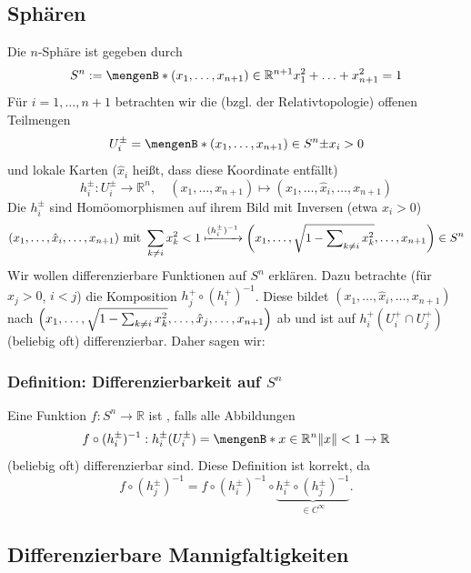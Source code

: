 \subsection{Sphären} %
\label{sub:11}%
Die $n$-Sphäre ist gegeben durch
\[
	S^n := \set[(x_1, \ldots , x_{n+1}) \in \mathds{R}^{n+1}]{x_1^2 + \ldots + x_{n+1}^2 = 1} 
\]
Für $i=1, \ldots , n+1$ betrachten wir die (bzgl. der Relativtopologie) offenen Teilmengen
\[
	U_i^{\pm} = \set[(x_1, \ldots , x_{n+1}) \in S^n]{\pm x_i >0} 
\]
und lokale Karten {\color{light_gray}\footnotesize($\hat x_i$ heißt, dass diese Koordinate entfällt)}
\[
	h_i^\pm : U_i^\pm \to \mathds{R}^n, \quad (x_1, \ldots , x_{n+1}) \mapsto (x_1, \ldots , \hat x_i, \ldots , x_{n+1}) \tag{weglassen}
\]
Die $h_i^\pm$ sind Homöomorphismen auf ihrem Bild mit Inversen (etwa $x_i >0$)
\[
	(x_1, \ldots , \hat x_i, \ldots , x_{n+1}) \text{ mit } \sum_{k\not= i} x_k^2< 1 \xmapsto{(h_i^\pm) ^{-1}} \enbrace*{x_1, \ldots , \sqrt{1- \sum\nolimits_{k\not=i} x_k^2 }, \ldots , x_{n+1}  } \in S^{n}  
\]
Wir wollen differenzierbare Funktionen auf $S^n$ erklären. Dazu betrachte (für $x_j >0$, $i<j$) die Komposition $h_j^+ \circ (h_i^+) ^{-1}$. Diese bildet
$(x_1, \ldots , \hat x_i, \ldots , x_{n+1})$ nach $\enbrace*{x_1, \ldots , \sqrt{1 - \sum_{k\not=i}x_k^2 }, \ldots , \hat x_j, \ldots , x_{n+1}  } $ ab und ist auf
$h_i^+(U_i^+ \cap U_j^+)$ (beliebig oft) differenzierbar. Daher sagen wir:

\subsubsection{Definition: Differenzierbarkeit auf $S^n$}
Eine Funktion $f : S^n \to \mathds{R}$ ist , falls alle Abbildungen 
\[
	f \circ (h_i^\pm) ^{-1} : h_i^\pm (U_i^\pm)  = \set[x \in \mathds{R}^n]{\norm{x}< 1 } \to \mathds{R} 
\]
(beliebig oft) differenzierbar sind.
Diese Definition ist korrekt, da 
\[
	f \circ (h_j^\pm) ^{-1} = f \circ (h_i^\pm) ^{-1} \circ \underbrace{h_i^\pm \circ (h_j^\pm) ^{-1}}_{\in C^\infty}.
\]

\subsection{Differenzierbare Mannigfaltigkeiten} %
\label{sub:12}
